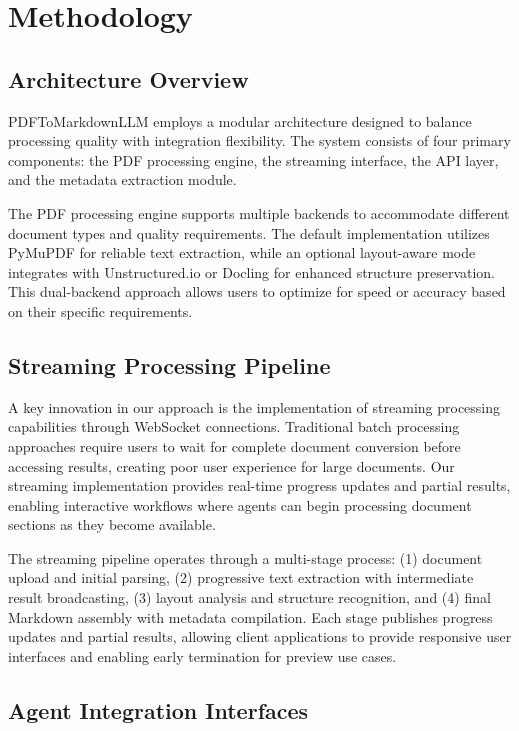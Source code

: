 \documentclass{article}
\begin{document}
\section{Methodology}

\subsection{Architecture Overview}

PDFToMarkdownLLM employs a modular architecture designed to balance processing quality with integration flexibility. The system consists of four primary components: the PDF processing engine, the streaming interface, the API layer, and the metadata extraction module.

The PDF processing engine supports multiple backends to accommodate different document types and quality requirements. The default implementation utilizes PyMuPDF for reliable text extraction, while an optional layout-aware mode integrates with Unstructured.io or Docling for enhanced structure preservation. This dual-backend approach allows users to optimize for speed or accuracy based on their specific requirements.

\subsection{Streaming Processing Pipeline}

A key innovation in our approach is the implementation of streaming processing capabilities through WebSocket connections. Traditional batch processing approaches require users to wait for complete document conversion before accessing results, creating poor user experience for large documents. Our streaming implementation provides real-time progress updates and partial results, enabling interactive workflows where agents can begin processing document sections as they become available.

The streaming pipeline operates through a multi-stage process: (1) document upload and initial parsing, (2) progressive text extraction with intermediate result broadcasting, (3) layout analysis and structure recognition, and (4) final Markdown assembly with metadata compilation. Each stage publishes progress updates and partial results, allowing client applications to provide responsive user interfaces and enabling early termination for preview use cases.

\subsection{Agent Integration Interfaces}
\end{document}
